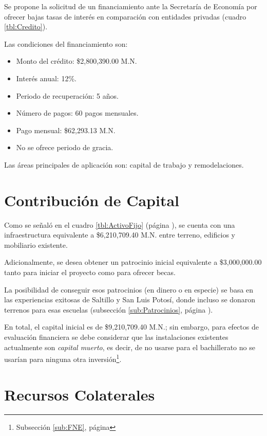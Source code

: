 Se propone la solicitud de un financiamiento ante la Secretaría de Economía por ofrecer bajas tasas de interés en comparación con entidades privadas (cuadro \ref{tbl:Credito}).

Las condiciones del financiamiento son:

\begin{itemize}
	\item Monto del crédito: \$2,800,390.00 M.N.
	\item Interés anual: 12\%.
	\item Periodo de recuperación: 5 años.
	\item Número de pagos: 60 pagos mensuales.
	\item Pago mensual: \$62,293.13 M.N.
	\item No se ofrece periodo de gracia.
\end{itemize}

Las áreas principales de aplicación son: capital de trabajo y remodelaciones.



\section{Contribución de Capital}
\label{sec:Capital}

Como se señaló en el cuadro \ref{tbl:ActivoFijo} (página \pageref{tbl:ActivoFijo}), se cuenta con una infraestructura equivalente a \$6,210,709.40 M.N. entre terreno, edificios y mobiliario existente.

Adicionalmente, se desea obtener un patrocinio inicial equivalente a \$3,000,000.00 tanto para iniciar el proyecto como para ofrecer becas.

La posibilidad de conseguir esos patrocinios (en dinero o en especie) se basa en las experiencias exitosas de Saltillo y San Luis Potosí, donde incluso se donaron terrenos para esas escuelas (subsección \ref{sub:Patrocinios}, página \pageref{sub:Patrocinios}).

En total, el capital inicial es de \$9,210,709.40 M.N.; sin embargo, para efectos de evaluación financiera se debe considerar que las instalaciones existentes actualmente son \emph{capital muerto}, es decir, de no usarse para el bachillerato no se usarían para ninguna otra inversión\footnote{Subsección \ref{sub:FNE}, página \pageref{sub:FNE}}.

\section{Recursos Colaterales}
\label{sec:RecursosColaterales}

